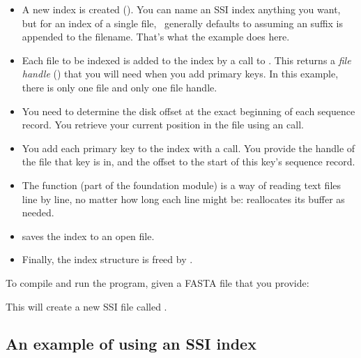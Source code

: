 \begin{itemize}
\item A new index is created ().  You can
      name an SSI index anything you want, but for an index of a
      single file, \Easel\ generally defaults to assuming an
       suffix is appended to the filename. That's what
      the example does here.

\item Each file to be indexed is added to the index by a call to
      . This returns a \emph{file handle}
      () that you will need when you add primary keys. In
      this example, there is only one file and only one file handle.

\item You need to determine the disk offset at the exact beginning of
      each sequence record. You retrieve your current position in the
      file using an  call.

\item You add each primary key to the index with a
       call. You provide the handle of the
      file that key is in, and the offset to the start of this key's
      sequence record.

\item The  function (part of the  
      foundation module) is a way of reading text files line by line, 
      no matter how long each line might be: 
      reallocates its buffer as needed.

\item {} saves the index to an open file.

\item Finally, the index structure is freed by
      .
\end{itemize}

To compile and run the program, given a FASTA file  that
you provide:

\begin{cchunk}
\end{cchunk}

This will create a new SSI file called .

\subsection{An example of using an SSI index}

